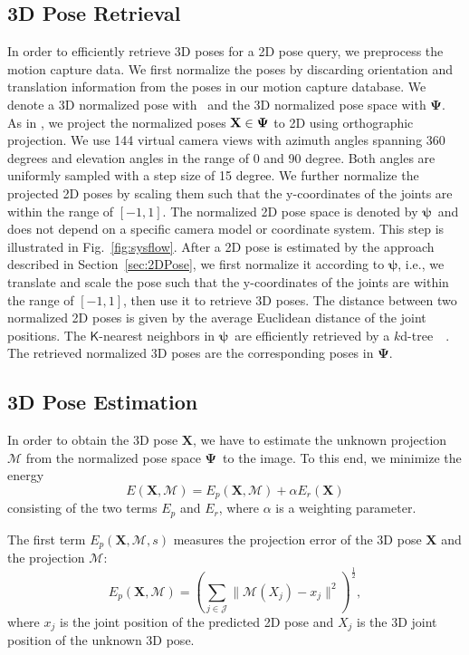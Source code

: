 \documentclass[10pt,journal,compsoc]{IEEEtran}
\makeatletter
\newcommand*{\ie}{i.e.\@\xspace}
\newcommand{\kdtree}{$k$d-tree~}
\newcommand{\nspacet}{\mbox{$\mathbf{\Psi}$}}
\newcommand{\nspace}{\mbox{$\mathbf{\psi}$}}
\makeatother
\begin{document}
\subsection{3D Pose Retrieval}\label{sec:similarity}
In order to efficiently retrieve 3D poses for a 2D pose query, we preprocess the motion capture data.
We first normalize the poses by discarding orientation and translation information from the poses in our
motion capture database. We denote a 3D normalized pose with \ptdn~and the 3D normalized pose space with \nspacet.
As in \cite{yasin-2013}, we project the normalized poses $\ptdn \in \nspacet$ to 2D using orthographic projection.
We use 144 virtual camera views with azimuth angles spanning 360 degrees and elevation angles in the range of 0 and
90 degree. Both angles are uniformly sampled with a step size of 15 degree. We further normalize the projected 2D 
poses by scaling them such that the y-coordinates of the joints are within the range of $[-1, 1]$.
The normalized 2D pose space is denoted by \nspace\ and does not depend on a specific camera model
or coordinate system. This step is illustrated in Fig.~\ref{fig:sysflow}. After a 2D pose is estimated by the 
approach described in Section~\ref{sec:2DPose}, we first normalize it according to \nspace, \ie, we 
translate and scale the pose such that the y-coordinates of the joints are within the range of $[-1, 1]$,  
then use it to retrieve 3D poses. The distance between two normalized 2D poses is given by the average Euclidean distance
of the joint positions. The $\mathsf{K}$-nearest neighbors in \nspace\ are efficiently retrieved by a
\kdtree~\cite{krueger-2010}. The retrieved normalized 3D poses are the corresponding poses in \nspacet. 

\subsection{3D Pose Estimation}\label{sec:posrec}
In order to obtain the 3D pose $\mathbf{X}$, we have to estimate the unknown projection 
$\mathcal{M}$ from the normalized pose space \nspacet\ to the image. To this end, we minimize the energy
\begin{equation}
E(\mathbf{X},\mathcal{M}) = E_{p}(\mathbf{X},\mathcal{M}) + \alpha E_{r}(\mathbf{X})
\label{eq:energyMin}
\end{equation}
consisting of the two terms $E_{p}$ and $E_{r}$, where $\alpha$ is a weighting parameter. 

The first term $E_{p}(\mathbf{X},\mathcal{M},s)$ measures the projection error of the 3D pose $\mathbf{X}$ and the projection $\mathcal{M}$:
\begin{equation}\label{eq:energyControl}
E_{p}(\mathbf{X},\mathcal{M}) = \left( \sum_{j \in \mathcal{J}} \| \mathcal{M}\left(X_{j}\right) - x_j\|^2 \right)^{\frac{1}{2}},
\end{equation}
where $x_j$ is the joint position of the predicted 2D pose and $X_{j}$ is the 3D joint position of the unknown 3D pose.
\end{document}
